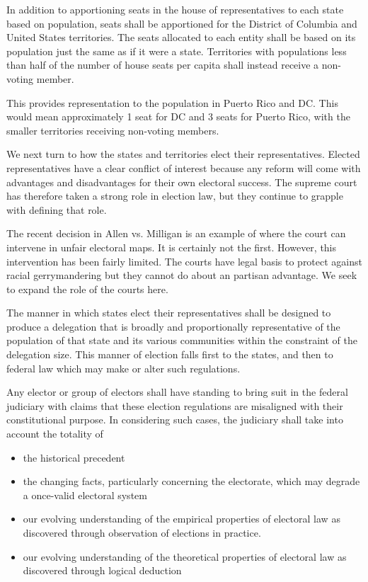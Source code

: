 \documentclass{article}
\begin{document}
\begin{quoting}
In addition to apportioning seats in the house of representatives to each state based on population, seats shall be apportioned for the District of Columbia and United States territories. The seats allocated to each entity shall be based on its population just the same as if it were a state. Territories with populations less than half of the number of house seats per capita shall instead receive a non-voting member.
\end{quoting}

This provides representation to the population in Puerto Rico and DC. This would mean approximately 1 seat for DC and 3 seats for Puerto Rico, with the smaller territories receiving non-voting members.

We next turn to how the states and territories elect their representatives. Elected representatives have a clear conflict of interest because any reform will come with advantages and disadvantages for their own electoral success. The supreme court has therefore taken a strong role in election law, but they continue to grapple with defining that role.

The recent decision in Allen vs. Milligan\cite{Allen_Milligan} is an example of where the court can intervene in unfair electoral maps. It is certainly not the first. However, this intervention has been fairly limited\cite{Brewer}. The courts have legal basis to protect against racial gerrymandering but they cannot do about an partisan advantage. We seek to expand the role of the courts here.

\begin{quoting}
The manner in which states elect their representatives shall be designed to produce a delegation that is broadly and proportionally representative of the population of that state and its various communities within the constraint of the delegation size. This manner of election falls first to the states, and then to federal law which may make or alter such regulations.

Any elector or group of electors shall have standing to bring suit in the federal judiciary with claims that these election regulations are misaligned with their constitutional purpose. In considering such cases, the judiciary shall take into account the totality of
\begin{itemize}
\item the historical precedent
\item the changing facts, particularly concerning the electorate, which may degrade a once-valid electoral system
\item our evolving understanding of the empirical properties of electoral law as discovered through observation of elections in practice.
\item our evolving understanding of the theoretical properties of electoral law as discovered through logical deduction
\end{itemize}
\end{quoting}
\end{document}
